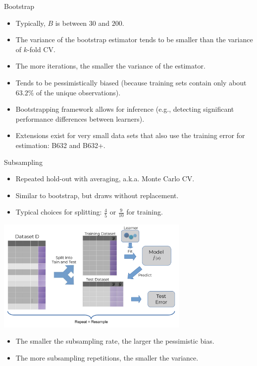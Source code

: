 \documentclass[11pt,compress,t,notes=noshow, xcolor=table]{beamer}
\begin{document}
\begin{vbframe}{Bootstrap}
\framebreak

\begin{itemize}
  \item Typically, $B$ is between $30$ and $200$.
  \item The variance of the bootstrap estimator tends to be smaller than the
  variance of $k$-fold CV.
  \item The more iterations, the smaller the variance of the estimator.
  \item Tends to be pessimistically biased
  (because training sets contain only about $63.2 \%$ of the unique observations).
  \item Bootstrapping framework allows for inference 
  (e.g., detecting significant performance differences between learners).
  \item Extensions exist for very small data sets that also use the training error for  estimation: B632 and B632+.
\end{itemize}

\end{vbframe}


\begin{vbframe}{Subsampling}

\begin{itemize}
  \item Repeated hold-out with averaging, a.k.a. Monte Carlo CV.
  \item Similar to bootstrap, but draws without replacement.
  \item Typical choices for splitting: $\frac{4}{5}$ or $\frac{9}{10}$ for 
  training.
\end{itemize}
\begin{center}
\includegraphics[width=0.7\textwidth]{figure_man/resampling_error.pdf}
\end{center}
\begin{itemize}
  \item The smaller the subsampling rate, the larger the pessimistic bias.
  \item The more subsampling repetitions, the smaller the variance.
\end{itemize}

\end{vbframe}
\end{document}
